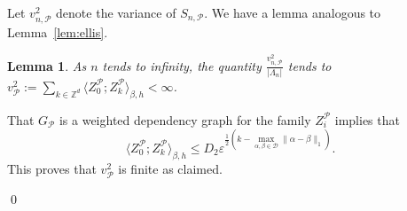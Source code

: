 \documentclass{amsart}
\newcommand{\field}[1]{\mathbb{#1}}
\newcommand{\Z}{\field{Z}}
\def\eps{\varepsilon}
\newcommand{\dist}[2]{\|#1 - #2\|_1}
\numberwithin{equation}{section}
\newtheorem{lemma}[theorem]{Lemma}
\theoremstyle{remark}
\renewenvironment{proof}[1][Proof]{\begin{trivlist}
\item[\hskip \labelsep {\bfseries #1:}]}{\qed\end{trivlist}}
\begin{document}
Let $v_{n,\mathcal{P}}^2$ denote the variance of $S_{n,\mathcal{P}}$.
We have a lemma analogous to Lemma~\ref{lem:ellis}.
\begin{lemma}
\label{lem:ellispower}
As $n$ tends to infinity, the quantity $\frac{v_{n,\mathcal{P}}^2}{|\Lambda_n|}$ tends to $v_{\mathcal{P}}^2 := \sum_{k \in \Z^d} \langle Z_0^{\mathcal{P}} ; Z_k^{\mathcal{P}} \rangle_{\beta,h}<\infty$. 
\end{lemma}
\begin{proof}
  That $G_{\mathcal{P}}$ is a weighted dependency graph for the family $Z^\mathcal{P}_i$ implies
  that 
  \[\langle Z_0^{\mathcal{P}} ; Z_k^{\mathcal{P}} \rangle_{\beta,h} \le 
  D_2 \eps^{\frac{1}{2} \left(k - \max_{\alpha,\beta \in \mathcal{D}} \dist{\alpha}{\beta}\right)}.\] 
  This proves that $v_{\mathcal{P}}^2$ is finite as claimed.


\end{proof}
\end{document}
